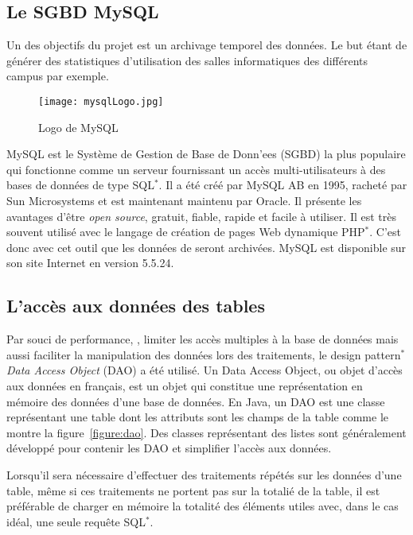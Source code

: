 \subsection{Le SGBD MySQL}

Un des objectifs du projet {\YuukouII} est un archivage temporel des donn\'ees.
Le but \'etant de g\'en\'erer des statistiques d'utilisation des salles informatiques des diff\'erents campus par exemple.

\begin{figure}[!ht]
	\centering
	\texttt{[image: mysqlLogo.jpg]}
	\caption{Logo de MySQL}
	
\end{figure}

MySQL est le Syst\`eme de Gestion de Base de Donn'ees (SGBD) la plus populaire qui fonctionne comme un serveur fournissant un acc\`es multi-utilisateurs \`a des bases de donn\'ees de type SQL$^*$.
Il a \'et\'e cr\'e\'e par MySQL AB en 1995, rachet\'e par Sun Microsystems et est maintenant maintenu par Oracle.
Il pr\'esente les avantages d'\^etre \textit{open source}, gratuit, fiable, rapide et facile \`a utiliser.
Il est tr\`es souvent utilis\'e avec le langage de cr\'eation de pages Web dynamique PHP$^*$.
C'est donc avec cet outil que les donn\'ees de {\YuukouII} seront archiv\'ees.
MySQL est disponible sur son site Internet\cite{biblio:siteMySQL} en version 5.5.24.

\subsection{L'acc\`es aux donn\'ees des tables}

Par souci de performance, \cad, limiter les acc\`es multiples \`a la base de donn\'ees mais aussi faciliter la manipulation des donn\'ees lors des traitements, le design pattern$^*$ \textit{Data Access Object} (DAO) a \'et\'e utilis\'e.
Un Data Access Object, ou objet d'acc\`es aux donn\'ees en fran\c{c}ais, est un objet qui constitue une repr\'esentation en m\'emoire des donn\'ees d'une base de donn\'ees.
En Java, un DAO est une classe repr\'esentant une table dont les attributs sont les champs de la table comme le montre la figure~\ref{figure:dao}.
Des classes repr\'esentant des listes sont g\'en\'eralement d\'evelopp\'e pour contenir les DAO et simplifier l'acc\`es aux donn\'ees.

Lorsqu'il sera n\'ecessaire d'effectuer des traitements r\'ep\'et\'es sur les donn\'ees d'une table, m\^eme si ces traitements ne portent pas sur la totali\'e de la table, il est pr\'ef\'erable de charger en m\'emoire la totalit\'e des \'el\'ements utiles avec, dans le cas id\'eal, une seule requ\^ete SQL$^*$.

